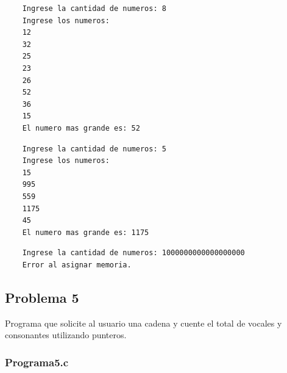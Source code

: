 \documentclass{article}
\begin{document}
	\begin{lstlisting}
	Ingrese la cantidad de numeros: 8
	Ingrese los numeros:
	12
	32
	25
	23
	26
	52
	36
	15
	El numero mas grande es: 52
	\end{lstlisting}
	
	\begin{lstlisting}
	Ingrese la cantidad de numeros: 5
	Ingrese los numeros:
	15
	995
	559
	1175
	45
	El numero mas grande es: 1175
	\end{lstlisting}
	
	\begin{lstlisting}
	Ingrese la cantidad de numeros: 1000000000000000000
	Error al asignar memoria.
	\end{lstlisting}
	
	\subsection{Problema 5}
	
	Programa que solicite al usuario una cadena y cuente el total de vocales y consonantes utilizando punteros.
	
	\subsubsection{Programa5.c}
	
\end{document}
